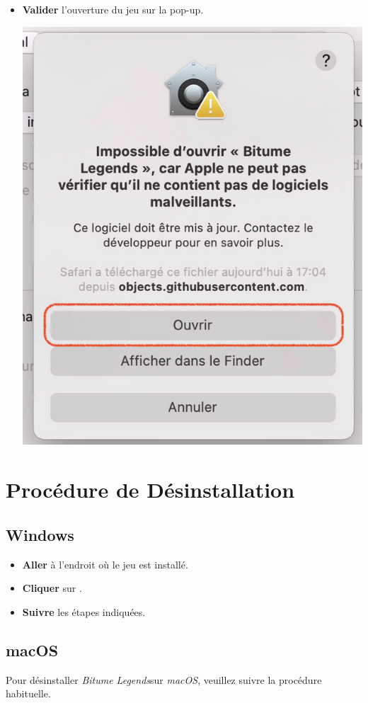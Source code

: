 \documentclass[a4paper,12pt]{article}
\newcommand{\btmlgs}{\textsl{Bitume Legends}}
\begin{document}
\begin{itemize}
\begin{center}
                \end{center}
            \item
                \textbf{Valider} l'ouverture du jeu sur la pop-up.\\
                \begin{center}
                    \includegraphics[scale=0.6]{ok_mac.png}
                \end{center}
        \end{itemize}

    \clearpage
    \section{Procédure de Désinstallation}
        \subsection*{Windows}
            \begin{itemize}
                \item
                    \textbf{Aller} à l'endroit où le jeu est installé.
                \item
                    \textbf{Cliquer} sur .
                \item
                    \textbf{Suivre} les étapes indiquées.
            \end{itemize}
        \subsection*{macOS}
            Pour désinstaller \btmlgs\;sur \textsl{macOS}, veuillez suivre la procédure habituelle.
\end{document}
